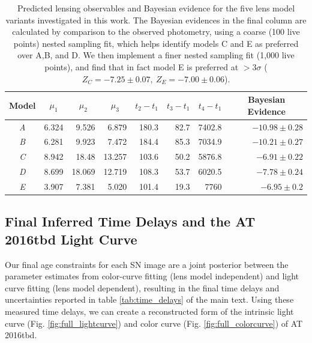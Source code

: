 \documentclass[12pt]{article}
\def\SNABC{AT 2016tbd\xspace}
\begin{document}
\begin{table}[ht]
\begin{tabular}{crrrrrrr}
    
    
    \multicolumn{1}{c}{Model} &\multicolumn{1}{c}{$\mu_1$} & \multicolumn{1}{c}{$\mu_2$} &\multicolumn{1}{c}{$\mu_3$} &\multicolumn{1}{c}{$t_2-t_1$} & \multicolumn{1}{c}{$t_3-t_1$}& \multicolumn{1}{c}{$t_4-t_1$} & \multicolumn{1}{c}{Bayesian Evidence}\\
\midrule
\textit{A} & 6.324 & 9.526 & 6.879 & 180.3 & 82.7&7402.8&$-10.98\pm0.28$ \\
\textit{B} & 6.281 & 9.923 & 7.472 & 184.4 & 85.3&7034.9&$-10.21\pm0.27$ \\
\textit{C} &8.942  & 18.48 & 13.257 & 103.6 & 50.2&5876.8&$-6.91\pm0.22$ \\
\textit{D} & 8.699 & 18.069 & 12.719 & 108.3 & 53.7&6020.5&$-7.78\pm0.24$ \\
\textit{E} & 3.907 & 7.381 & 5.020 & 101.4 & 19.3&7760&$-6.95\pm0.2$ \\
\end{tabular}
\caption{\label{tab:model_evidence}Predicted lensing observables and Bayesian evidence for the five lens model variants investigated in this work. The Bayesian evidences in the final column are calculated by comparison to the observed photometry, using a coarse (100 live points) nested sampling fit, which helps identify models C and E as preferred over A,B, and D. We then implement a finer nested sampling fit (1,000 live points), and find that in fact model E is preferred at $>3\sigma$ ($Z_C=-7.25\pm0.07, \ Z_E=-   7.00\pm0.06$).}
\end{table}


\subsection*{Final Inferred Time Delays and the \SNABC Light Curve}

Our final age constraints for each SN image are a joint posterior between the parameter estimates from color-curve fitting (lens model independent) and light curve fitting (lens model dependent), resulting in the final time delays and uncertainties reported in table \ref{tab:time_delays} of the main text. Using these measured time delays, we can create a reconstructed form of the intrinsic light curve (Fig. \ref{fig:full_lightcurve}) and color curve (Fig. \ref{fig:full_colorcurve}) of \SNABC.
\end{document}
